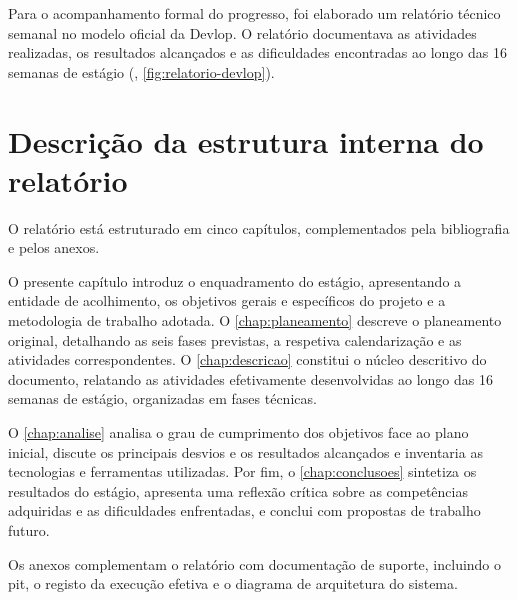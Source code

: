 Para o acompanhamento formal do progresso, foi elaborado um relatório técnico semanal no modelo oficial da Devlop. O relatório documentava as atividades realizadas, os resultados alcançados e as dificuldades encontradas ao longo das 16 semanas de estágio (, \autoref{fig:relatorio-devlop}).

\section{Descrição da estrutura interna do relatório}

O relatório está estruturado em cinco capítulos, complementados pela bibliografia e pelos anexos.

O presente capítulo introduz o enquadramento do estágio, apresentando a entidade de acolhimento, os objetivos gerais e específicos do projeto e a metodologia de trabalho adotada. O \autoref{chap:planeamento} descreve o planeamento original, detalhando as seis fases previstas, a respetiva calendarização e as atividades correspondentes. O \autoref{chap:descricao} constitui o núcleo descritivo do documento, relatando as atividades efetivamente desenvolvidas ao longo das 16 semanas de estágio, organizadas em fases técnicas.

O \autoref{chap:analise} analisa o grau de cumprimento dos objetivos face ao plano inicial, discute os principais desvios e os resultados alcançados e inventaria as tecnologias e ferramentas utilizadas. Por fim, o \autoref{chap:conclusoes} sintetiza os resultados do estágio, apresenta uma reflexão crítica sobre as competências adquiridas e as dificuldades enfrentadas, e conclui com propostas de trabalho futuro.

Os anexos complementam o relatório com documentação de suporte, incluindo o \gls{pit}, o registo da execução efetiva e o diagrama de arquitetura do sistema.

